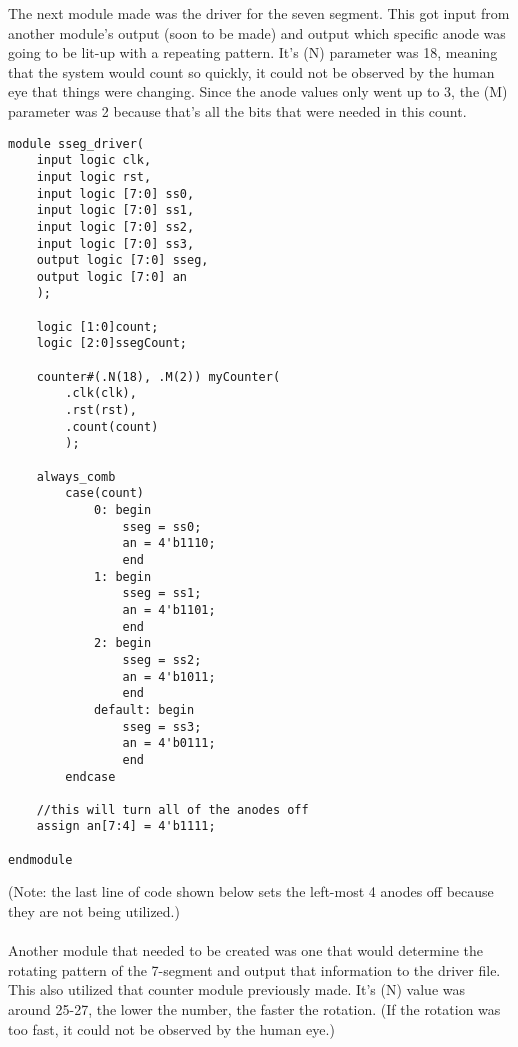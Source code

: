 \documentclass[11pt]{article}
\begin{document}
The next module made was the driver for the seven segment. This got input from another module's output (soon to be made) and output which specific anode was going to be lit-up with a repeating pattern. It's (N) parameter was 18, meaning that the system would count so quickly, it could not be observed by the human eye that things were changing. Since the anode values only went up to 3, the (M) parameter was 2 because that's all the bits that were needed in this count. 

\begin{lstlisting}[style=Verilog,caption= Seven-Segment Driver Code,label=code:ex ]
module sseg_driver(
	input logic clk,
	input logic rst,
	input logic [7:0] ss0,
	input logic [7:0] ss1,
	input logic [7:0] ss2,
	input logic [7:0] ss3,
	output logic [7:0] sseg,
	output logic [7:0] an
	);

	logic [1:0]count; 
	logic [2:0]ssegCount; 
	
	counter#(.N(18), .M(2)) myCounter( 
		.clk(clk), 
		.rst(rst), 
		.count(count) 
		); 
	
	always_comb 
		case(count) 
			0: begin 
				sseg = ss0; 
				an = 4'b1110; 
				end 
			1: begin 
				sseg = ss1; 
				an = 4'b1101; 
				end 
			2: begin 
				sseg = ss2; 
				an = 4'b1011; 
				end 
			default: begin 
				sseg = ss3; 
				an = 4'b0111; 
				end 
		endcase 
	
	//this will turn all of the anodes off
	assign an[7:4] = 4'b1111;    

endmodule
\end{lstlisting}

(Note: the last line of code shown below sets the left-most 4 anodes off because they are not being utilized.)\\\\

Another module that needed to be created was one that would determine the rotating pattern of the 7-segment and output that information to the driver file. This also utilized that counter module previously made. It's (N) value was around 25-27, the lower the number, the faster the rotation. (If the rotation was too fast, it could not be observed by the human eye.)
\end{document}
